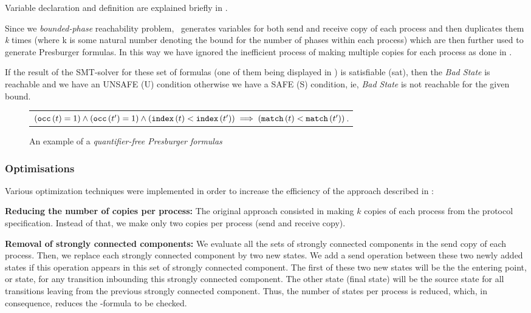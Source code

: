 Variable declaration and definition are explained briefly in \cite{AAC13}.


Since we  \emph{bounded-phase} reachability problem, \MPass\ generates variables for both send and receive copy of 
each process and then duplicates them \emph{k} times (where k is some natural number denoting the bound for the number of phases within each process) which are then further used to generate Presburger formulas. In this way we have ignored the inefficient process of making 
multiple copies for each process as done in \cite{AAC13}.

If the result of the SMT-solver for these set of formulas (one of them being displayed in ) is 
satisfiable (sat), then the \emph{Bad State} is reachable and we have an UNSAFE (U) condition otherwise we have a SAFE (S) condition, ie, 
\emph{Bad State} is  not reachable for the given bound.
\begin{figure}[h]
\begin{center}
\begin{tabular}{l@{\hspace{20pt}}}
$
\left({\tt occ}\left({t}\right)=1\right)
\wedge
\left({\tt occ}\left({t'}\right)=1\right)
\wedge
\left({\tt index}\left({t}\right)<{\tt index}\left({t'}\right)\right)
\implies
\left({\tt match}\left({t}\right)<{\tt match}\left({t'}\right)\right)
$.
\end{tabular}
\end{center}
\caption{An example of a \emph{quantifier-free Presburger formulas}}\label{fig:examples}
\end{figure}

\subsubsection{Optimisations}

Various optimization techniques were implemented in order to increase the efficiency of the approach described in  \cite{AAC13}:

\begin{description}
\item{\textbf{Reducing the number of copies per process:}}
The original approach consisted in making $k$ copies of each process from the protocol specification.
Instead of that, we make only two copies per process (send and receive copy).
%
\item{\textbf{Removal of strongly connected components:}}
We evaluate all the sets of strongly connected components in the send copy of each process. 
Then, we replace each strongly connected component by two new states.
We add a send operation between these two newly added states if this operation appears in this set of strongly connected component.
The first of these two new states will be the the entering point, or state, for any transition inbounding this strongly connected component.
The other state (final state) will be  the source state for all transitions leaving from the previous strongly connected component.
Thus, the number of states per process is reduced, which, in consequence, reduces the \Smt-formula to be checked.
\end{description}
